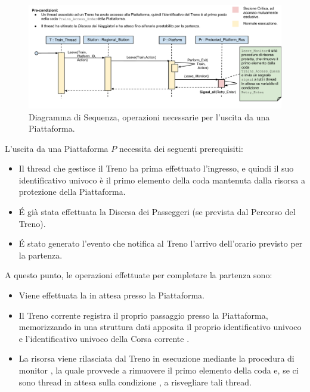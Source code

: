 \begin{description}
		\begin{figure}[htbp]
			\includegraphics[trim = 45mm 0mm 0mm 0mm,scale=0.55]{imgs/platform_exit_Sequence_Diagram.pdf}
			\caption{\footnotesize{Diagramma di Sequenza, operazioni necessarie per l'uscita da una Piattaforma.}}
			\label{fig:platform_access}
		\end{figure}
		
		L'uscita da una Piattaforma $P$ necessita dei seguenti prerequisiti:
		
			\begin{itemize}
				\item Il thread che gestisce il Treno ha prima effettuato l'ingresso, e quindi il suo identificativo univoco è il primo elemento della coda  mantenuta dalla risorsa  a protezione della Piattaforma.
				\item \'E già stata effettuata la Discesa dei Passeggeri (se prevista dal Percorso del Treno).
				\item \'E stato generato l'evento che notifica al Treno l'arrivo dell'orario previsto per la partenza.
			\end{itemize}
		
		A questo punto, le operazioni effettuate per completare la partenza sono:
		
			\begin{itemize}
				\item Viene effettuata la  in attesa presso la Piattaforma. 
				\item Il Treno corrente registra il proprio passaggio presso la Piattaforma, memorizzando in una struttura dati apposita  il proprio identificativo univoco e l'identificativo univoco della Corsa corrente .
				\item La risorsa viene rilasciata dal Treno in esecuzione mediante la procedura di monitor , la quale provvede a rimuovere il primo elemento della coda  e, se ci sono thread in attesa sulla condizione , a risvegliare tali thread.
			\end{itemize}
		

\end{description}
